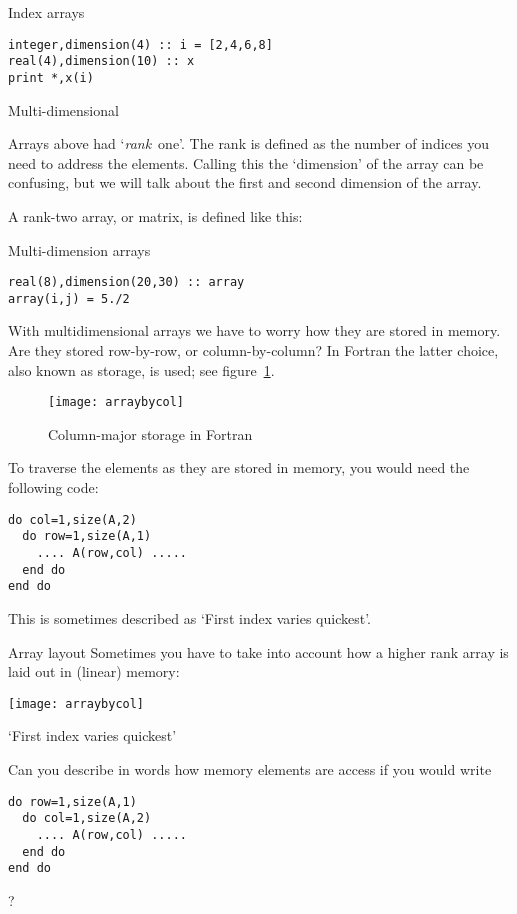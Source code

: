 \begin{block}{Index arrays}
  \label{sl:farray-indexarray}
\begin{lstlisting}
integer,dimension(4) :: i = [2,4,6,8]
real(4),dimension(10) :: x
print *,x(i)
\end{lstlisting}
\end{block}

 {Multi-dimensional}

Arrays above had `\emph{rank}~one'. The rank is
defined as the number of indices you need to address the
elements. Calling this the `dimension' of the array can be confusing, but
we will talk about the first and second dimension of the array.

A rank-two array, or matrix, is defined like this:
\begin{block}{Multi-dimension arrays}
  \label{sl:farray-2d}
\begin{lstlisting}
real(8),dimension(20,30) :: array
array(i,j) = 5./2
\end{lstlisting}
\end{block}

With multidimensional arrays we have to worry how they are stored in
memory. Are they stored row-by-row, or column-by-column? In Fortran
the latter choice, also known as  storage,
is used; see figure~\ref{fig:column-major}.

\begin{figure}[ht]
  \texttt{[image: arraybycol]}
  \caption{Column-major storage in Fortran}
  \label{fig:column-major}
\end{figure}

To traverse the elements as they are stored in memory, you would need
the following code:
\begin{lstlisting}
do col=1,size(A,2)
  do row=1,size(A,1)
    .... A(row,col) .....
  end do
end do
\end{lstlisting}
This is sometimes described as `First index varies quickest'.

\begin{slide}{Array layout}
  \label{sl:farray-layout}
  Sometimes you have to take into account how a higher rank array
  is laid out in (linear) memory:

  \texttt{[image: arraybycol]}

  `First index varies quickest'
\end{slide}

\begin{exercise}
  Can you describe in words how memory elements are access if you
  would write
\begin{lstlisting}
do row=1,size(A,1)
  do col=1,size(A,2)
    .... A(row,col) .....
  end do
end do
\end{lstlisting}
?
\end{exercise}

